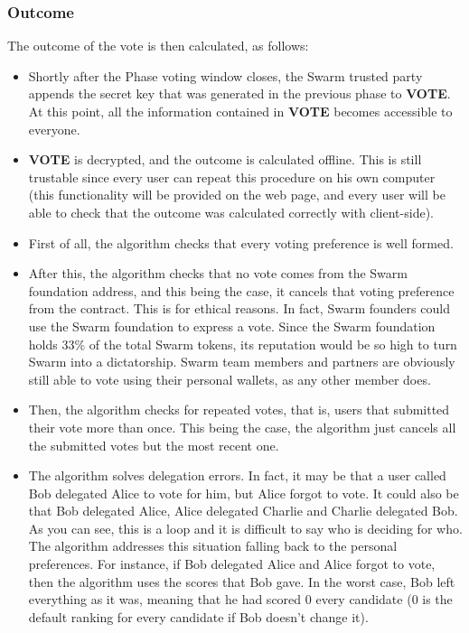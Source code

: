 \documentclass[submission, copyright,creativecommons,sharealike,noncommercial]{eptcs}
\newcommand{\Vote}{\textbf{VOTE}\xspace}
\begin{document}
\subsubsection{Outcome}\label{subsubsec:Intuitive Outcome}
%
		The outcome of the vote is then calculated, as follows:
		\begin{itemize}	
			\item Shortly after the Phase voting window closes, the Swarm trusted party appends the secret key that was generated in the previous phase to \Vote. At this point, all the information contained in \Vote becomes accessible to everyone.
			\item \Vote is decrypted, and the outcome is calculated offline. This is still trustable since every user can repeat this procedure on his own computer (this functionality will be provided on the web page, and every user will be able to check that the outcome was calculated correctly with client-side).
			\item First of all, the algorithm checks that every voting preference is well formed.
			\item After this, the algorithm checks that no vote comes from the Swarm foundation address, and this being the case, it cancels that voting preference from the contract. This is for ethical reasons. In fact, Swarm founders could use the Swarm foundation to express a vote. Since the Swarm foundation holds 33\% of the total Swarm tokens, its reputation would be so high to turn Swarm into a dictatorship. Swarm team members and partners are obviously still able to vote using their personal wallets, as any other member does.
			\item Then, the algorithm checks for repeated votes, that is, users that submitted their vote more than once. This being the case, the algorithm just cancels all the submitted votes but the most recent one.
			\item The algorithm solves delegation errors. In fact, it may be that a user called Bob delegated Alice to vote for him, but Alice forgot to vote. It could also be that Bob delegated Alice, Alice delegated Charlie and Charlie delegated Bob. As you can see, this is a loop and it is difficult to say who is deciding for who. The algorithm addresses this situation falling back to the personal preferences. For instance, if Bob delegated Alice and Alice forgot to vote, then the algorithm uses the scores that Bob gave. In the worst case, Bob left everything as it was, meaning that he had scored $0$ every candidate ($0$ is the default ranking for every candidate if Bob doesn't change it).

\end{itemize}
\end{document}
